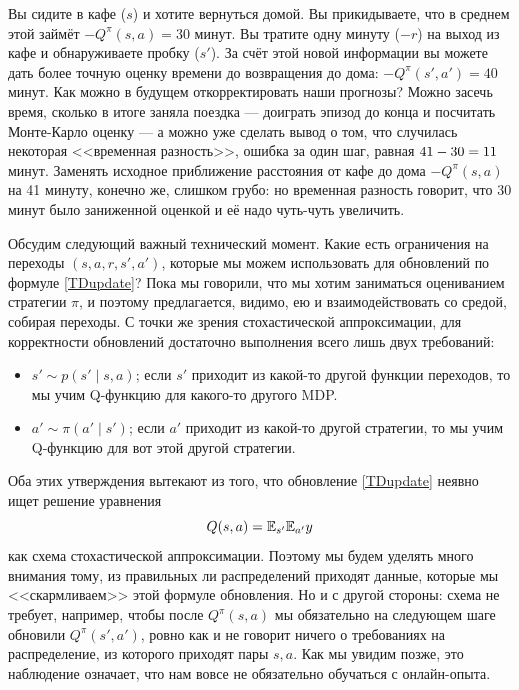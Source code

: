 \begin{example}
Вы сидите в кафе ($s$) и хотите вернуться домой. Вы прикидываете, что в среднем этой займёт $-Q^\pi(s, a) = 30$ минут. Вы тратите одну минуту ($-r$) на выход из кафе и обнаруживаете пробку ($s'$). За счёт этой новой информации вы можете дать более точную оценку времени до возвращения до дома: $-Q^\pi(s', a') = 40$ минут. Как можно в будущем откорректировать наши прогнозы? Можно засечь время, сколько в итоге заняла поездка --- доиграть эпизод до конца и посчитать Монте-Карло оценку --- а можно уже сделать вывод о том, что случилась некоторая <<временная разность>>, ошибка за один шаг, равная $41 - 30 \HM= 11$ минут. Заменять исходное приближение расстояния от кафе до дома $-Q^\pi(s, a)$ на 41 минуту, конечно же, слишком грубо: но временная разность говорит, что 30 минут было заниженной оценкой и её надо чуть-чуть увеличить.
\end{example}

Обсудим следующий важный технический момент. Какие есть ограничения на переходы $(s, a, r, s', a')$, которые мы можем использовать для обновлений по формуле \eqref{TDupdate}? Пока мы говорили, что мы хотим заниматься оцениванием стратегии $\pi$, и поэтому предлагается, видимо, ею и взаимодействовать со средой, собирая переходы. С точки же зрения стохастической аппроксимации, для корректности обновлений достаточно выполнения всего лишь двух требований:
\begin{itemize}
    \item $s' \sim p(s' \mid s, a)$; если $s'$ приходит из какой-то другой функции переходов, то мы учим Q-функцию для какого-то другого MDP.
    \item $a' \sim \pi(a' \mid s')$; если $a'$ приходит из какой-то другой стратегии, то мы учим Q-функцию для вот этой другой стратегии.
\end{itemize}
Оба этих утверждения вытекают из того, что обновление \eqref{TDupdate} неявно ищет решение уравнения
$$Q(s, a) = \mathbb{E}_{s'} \mathbb{E}_{a'} y$$
как схема стохастической аппроксимации. Поэтому мы будем уделять много внимания тому, из правильных ли распределений приходят данные, которые мы <<скармливаем>> этой формуле обновления. Но и с другой стороны: схема не требует, например, чтобы после $Q^{\pi}(s, a)$ мы обязательно на следующем шаге обновили $Q^{\pi}(s', a')$, ровно как и не говорит ничего о требованиях на распределение, из которого приходят пары $s, a$. Как мы увидим позже, это наблюдение означает, что нам вовсе не обязательно обучаться с онлайн-опыта.

